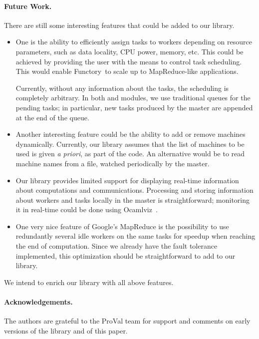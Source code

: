 \documentclass[tfpsymp,pagenumbers]{tfp07symp}
\newcommand{\functory}{\textsf{Functory}}
\begin{document}
\paragraph{Future Work.}
There are still some interesting features that could be added to our
library. 
\begin{itemize}
\item 
  One is the ability to efficiently assign tasks to workers depending
  on resource parameters, such as data locality, CPU power, memory,
  etc. This could be achieved by providing the user with the means to control
  task scheduling.  This would enable \functory\ to scale up to
  MapReduce-like applications.

  Currently, without any information about the tasks, the scheduling
  is completely arbitrary. In both  and 
  modules, we use traditional queues for the pending tasks; in
  particular, new tasks produced by the master are appended at the end
  of the queue.

\item 
  Another interesting feature could be the ability
  to add or remove machines dynamically. Currently, our library assumes
  that the list of machines to be used is given \emph{a priori}, as
  part of the code. An alternative would be to read machine names from
  a file, watched periodically by the master.
\item
  Our library provides limited support for displaying real-time
  information about computations and communications. Processing and storing
  information about workers and tasks locally in the master is straightforward; 
  monitoring it in real-time could be done using
  \textsf{Ocamlviz}~\cite{ocamlviz}. 
\item 
  One very nice feature of Google's MapReduce is the possibility to
  use redundantly several idle workers on the same tasks
  for speedup when reaching the end of computation.
  Since we already have the fault tolerance implemented, this
  optimization should be straightforward to add to our library.
\end{itemize}
We intend to enrich our library with all above features.



\paragraph{Acknowledgements.}
The authors are grateful to the ProVal team for support and comments
on early versions of the library and of this paper.



\end{document}
